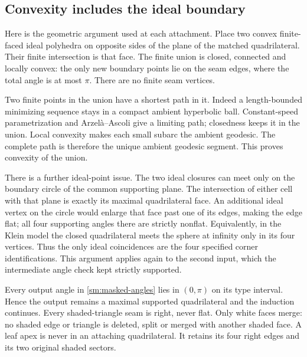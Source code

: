 \subsection{Convexity includes the ideal boundary}
Here is the geometric argument used at each attachment. Place two
convex finite-faced ideal polyhedra on opposite sides of the plane
of the matched quadrilateral. Their finite intersection is that
face. The finite union is closed, connected and locally convex:
the only new boundary points lie on the seam edges, where the
total angle is at most $\pi$. There are no finite seam vertices.

Two finite points in the union have a shortest path in it.
Indeed a length-bounded minimizing sequence stays in a compact
ambient hyperbolic ball. Constant-speed parametrization and
Arzelà--Ascoli give a limiting path; closedness keeps it in the
union. Local convexity makes each small subarc the ambient
geodesic. The complete path is therefore the unique ambient
geodesic segment. This proves convexity of the union.

There is a further ideal-point issue. The two ideal closures can
meet only on the boundary circle of the common supporting plane.
The intersection of either cell with that plane is exactly its
maximal quadrilateral face. An additional ideal vertex on the
circle would enlarge that face past one of its edges, making the
edge flat; all four supporting angles there are strictly nonflat.
Equivalently, in the Klein model the closed quadrilateral meets
the sphere at infinity only in its four vertices. Thus the only
ideal coincidences are the four specified corner identifications.
This argument applies again to the second input, which the
intermediate angle check kept strictly supported.

Every output angle in \eqref{sm:masked-angles} lies in $(0,\pi)$
on its type interval. Hence the output remains a maximal
supported quadrilateral and the induction continues. Every
shaded-triangle seam is right, never flat. Only white faces merge:
no shaded edge or triangle is deleted, split or merged with
another shaded face. A leaf apex is never in an attaching
quadrilateral. It retains its four right edges and its two
original shaded sectors.

